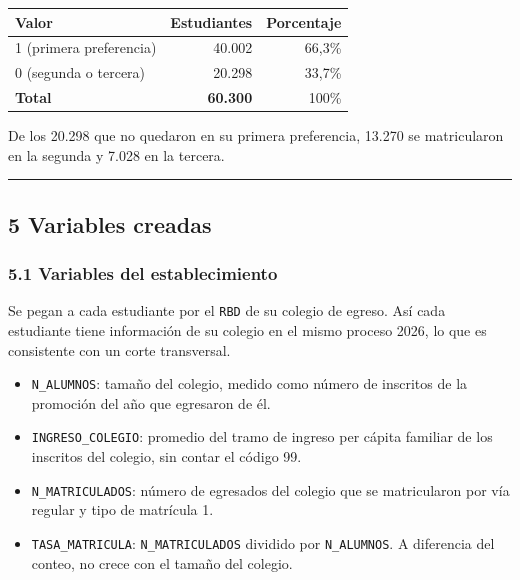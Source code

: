 \documentclass[11pt,letterpaper]{article}
\begin{document}
\begin{center}
\begin{tabular}{lrr}
\toprule
\textbf{Valor} & \textbf{Estudiantes} & \textbf{Porcentaje} \\
\midrule
1 (primera preferencia) & 40.002 & 66,3\% \\
0 (segunda o tercera)   & 20.298 & 33,7\% \\
\midrule
\textbf{Total} & \textbf{60.300} & 100\% \\
\bottomrule
\end{tabular}
\end{center}

De los 20.298 que no quedaron en su primera preferencia, 13.270 se
matricularon en la segunda y 7.028 en la tercera.

\medskip\hrule\medskip

\subsection*{5 \; Variables creadas}

\subsubsection*{5.1 \; Variables del establecimiento}

Se pegan a cada estudiante por el \texttt{RBD} de su colegio de egreso.
Así cada estudiante tiene información de su colegio en el mismo proceso
2026, lo que es consistente con un corte transversal.

\begin{itemize}[leftmargin=1.5em, itemsep=0.3em]
  \item \texttt{N\_ALUMNOS}: tamaño del colegio, medido como número de
        inscritos de la promoción del año que egresaron de él.
  \item \texttt{INGRESO\_COLEGIO}: promedio del tramo de ingreso per
        cápita familiar de los inscritos del colegio, sin contar el
        código 99.
  \item \texttt{N\_MATRICULADOS}: número de egresados del colegio que se
        matricularon por vía regular y tipo de matrícula 1.
  \item \texttt{TASA\_MATRICULA}: \texttt{N\_MATRICULADOS} dividido por
        \texttt{N\_ALUMNOS}. A diferencia del conteo, no crece con el
        tamaño del colegio.
\end{itemize}
\end{document}
